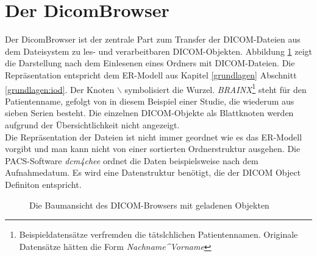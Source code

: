 \section{Der DicomBrowser}
Der DicomBrowser ist der zentrale Part zum Transfer der DICOM-Dateien aus dem Dateisystem zu les- und verarbeitbaren DICOM-Objekten. Abbildung \ref{dicombrowser} zeigt die Darstellung nach dem Einlesenen eines Ordners mit DICOM-Dateien. Die Repräsentation entspricht dem ER-Modell aus Kapitel \ref{grundlagen} Abschnitt \ref{grundlagen:iod}. Der Knoten $\backslash$ symbolisiert die Wurzel. \textit{BRAINX}\footnote{Beispieldatensätze verfremden die tätslchlichen Patientennamen. Originale Datensätze hätten die Form \textit{Nachname\^{}Vorname}} steht für den Patientenname, gefolgt von in diesem Beispiel einer Studie, die wiederum aus sieben Serien besteht. Die einzelnen DICOM-Objekte als Blattknoten werden aufgrund der Übersichtlichkeit nicht angezeigt.\\
Die Repräsentation der Dateien ist nicht immer geordnet wie es das ER-Modell vorgibt und man kann nicht von einer sortierten Ordnerstruktur ausgehen. Die PACS-Software \textit{dcm4chee} ordnet die Daten beispielsweise nach dem Aufnahmedatum. Es wird eine Datenstruktur benötigt, die der DICOM Object Definiton entspricht.

\begin{figure}[htbp]
  \vspace{0.5cm}
  \centering
   \caption{Die Baumansicht des DICOM-Browsers mit geladenen Objekten}
  \label{dicombrowser}
  \vspace{0.5cm}
\end{figure}

